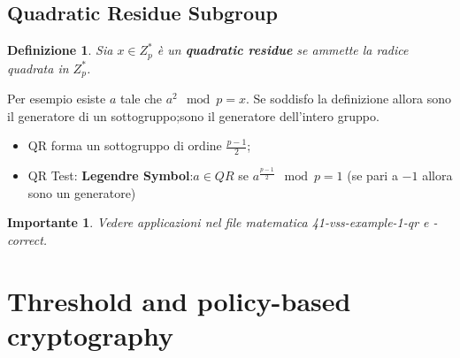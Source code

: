 \documentclass{book}
\newtheorem{Definizione}{\textbf{Definizione}}
\newtheorem*{Importante}{\textbf{Importante}}
\begin{document}
\section{Quadratic Residue Subgroup}
\begin{Definizione}
    Sia \(x\in Z_{p}^{*}\) è un \textbf{quadratic residue} se ammette la radice quadrata in \(Z_{p}^{*}\).
\end{Definizione}
Per esempio esiste \(a\) tale che \(a^{2}\mod{p}=x\).\newline
Se soddisfo la definizione allora sono il generatore di un sottogruppo;\@altrimenti sono il generatore dell'intero gruppo.
\begin{itemize}
    \item QR forma un sottogruppo di ordine \(\frac{p-1}{2}\);
    \item QR Test: \textbf{Legendre Symbol}:\(a\in QR\) se \(a^{\frac{p-1}{2}}\mod{p}=1\) (se pari a \(-1\) allora sono un generatore)
\end{itemize}
\begin{Importante}
    Vedere applicazioni nel file matematica 41-vss-example-1-qr e -correct.
\end{Importante}
\chapter{Threshold and policy-based cryptography}
\end{document}
